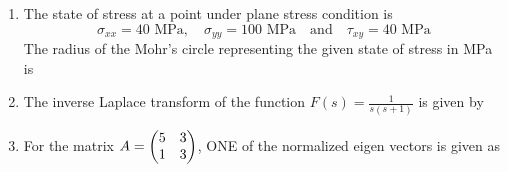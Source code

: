 \documentclass[journal,12pt,onecolumn]{IEEEtran}
\begin{document}
\begin{enumerate}[resume]
          \begin{enumerate}
          \end{enumerate}

    \item The state of stress at a point under plane stress condition is
          \[\sigma_{xx} = 40 \text{ MPa}, \quad \sigma_{yy} = 100 \text{ MPa} \quad \text{and} \quad \tau_{xy} = 40 \text{ MPa}\]
          The radius of the Mohr's circle representing the given state of stress in MPa is

          \begin{enumerate}
          \end{enumerate}

    \item The inverse Laplace transform of the function \(F(s) = \frac{1}{s(s+1)}\) is given by

          \begin{enumerate}
          \end{enumerate}

    \item For the matrix \(A = \begin{pmatrix}5 & 3 \\ 1 & 3\end{pmatrix}\), ONE of the normalized eigen vectors is given as


\end{enumerate}
\end{document}
